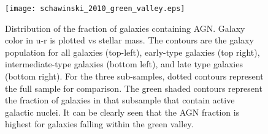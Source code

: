 \begin{figure}[H]
\centering
\texttt{[image: schawinski\_2010\_green\_valley.eps]}
\caption[Distribution of the fraction of galaxies containing AGN]{\footnotesize Distribution of the fraction of galaxies containing AGN.  Galaxy color in u-r is plotted vs stellar mass.  The contours are the galaxy population for all galaxies (top-left), early-type galaxies (top right), intermediate-type galaxies (bottom left), and late type galaxies (bottom right).  For the three sub-samples, dotted contours represent the full sample for comparison.  The green shaded contours represent the fraction of galaxies in that subsample that contain active galactic nuclei.  It can be clearly seen that the AGN fraction is highest for galaxies falling within the green valley.  \citep{schawinski_2010}}
\label{fig:green_valley}
\end{figure}






